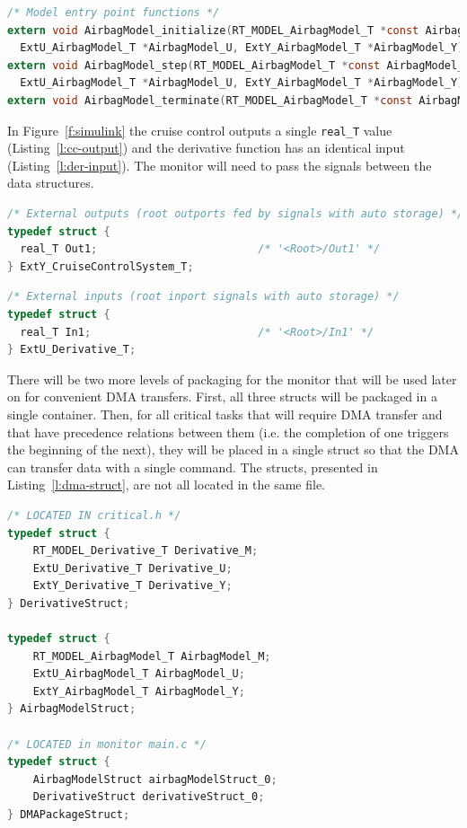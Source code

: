 \documentclass[table,11pt]{article}
\begin{document}
\begin{lstlisting}[caption={Airbag model function declarations},label=l:airbag-proto,language=C]
/* Model entry point functions */
extern void AirbagModel_initialize(RT_MODEL_AirbagModel_T *const AirbagModel_M,
  ExtU_AirbagModel_T *AirbagModel_U, ExtY_AirbagModel_T *AirbagModel_Y);
extern void AirbagModel_step(RT_MODEL_AirbagModel_T *const AirbagModel_M,
  ExtU_AirbagModel_T *AirbagModel_U, ExtY_AirbagModel_T *AirbagModel_Y);
extern void AirbagModel_terminate(RT_MODEL_AirbagModel_T *const AirbagModel_M);
\end{lstlisting}

In Figure~\ref{f:simulink} the cruise control outputs a single \texttt{real\_T} value (Listing~\ref{l:cc-output}) and the derivative function has an identical input (Listing~\ref{l:der-input}). The monitor will need to pass the signals between the data structures.
\begin{lstlisting}[caption={Cruise control output struct definition},label=l:cc-output,language=C]
/* External outputs (root outports fed by signals with auto storage) */
typedef struct {
  real_T Out1;                         /* '<Root>/Out1' */
} ExtY_CruiseControlSystem_T;
\end{lstlisting}

\begin{lstlisting}[caption={Derivative input struct definition},label=l:der-input,language=C]
/* External inputs (root inport signals with auto storage) */
typedef struct {
  real_T In1;                          /* '<Root>/In1' */
} ExtU_Derivative_T;
\end{lstlisting}

There will be two more levels of packaging for the monitor that will be used later on for convenient DMA transfers. First, all three structs will be packaged in a single container. Then, for all critical tasks that will require DMA transfer and that have precedence relations between them (i.e. the completion of one triggers the beginning of the next), they will be placed in a single struct so that the DMA can transfer data with a single command. The structs, presented in Listing~\ref{l:dma-struct}, are not all located in the same file.

\begin{lstlisting}[caption={Structures of structures to facilitate DMA transfer.},label=l:dma-struct,language=C]
/* LOCATED IN critical.h */
typedef struct {
	RT_MODEL_Derivative_T Derivative_M;
	ExtU_Derivative_T Derivative_U;
	ExtY_Derivative_T Derivative_Y;
} DerivativeStruct;

typedef struct {
	RT_MODEL_AirbagModel_T AirbagModel_M;
	ExtU_AirbagModel_T AirbagModel_U;
	ExtY_AirbagModel_T AirbagModel_Y;
} AirbagModelStruct;

/* LOCATED in monitor main.c */
typedef struct {
	AirbagModelStruct airbagModelStruct_0;
	DerivativeStruct derivativeStruct_0;
} DMAPackageStruct;
\end{lstlisting}
\end{document}
